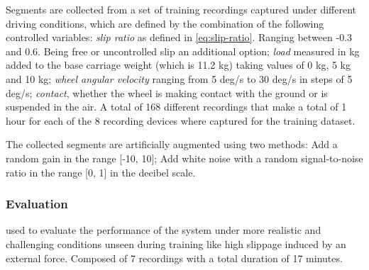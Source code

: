 Segments are collected from a set of training recordings captured under
different driving conditions, which are defined by the combination of the
following controlled variables: \emph{slip ratio} as defined in
\cref{eq:slip-ratio}. Ranging between -0.3 and 0.6. Being free or uncontrolled
slip an additional option; \emph{load} measured in kg added to the base
carriage weight (which is 11.2 kg) taking values of 0 kg, 5 kg and 10 kg;
\emph{wheel angular velocity} ranging from 5 deg/s to 30 deg/s in steps of 5
deg/s; \emph{contact}, whether the wheel is making contact with the ground or
is suspended in the air. A total of 168 different recordings that make a total
of 1 hour for each of the 8 recording devices where captured for the training
dataset.



The collected segments are artificially augmented using two methods: Add a
random gain in the range [-10, 10]; Add white noise with a random
signal-to-noise ratio in the range [0, 1] in the decibel scale.

\subsubsection{Evaluation} \label{subsubsec:evaluatio-dataset}
used to evaluate the performance of the system under more realistic and
challenging conditions unseen during training like high slippage induced by an
external force. Composed of 7 recordings with a total duration of 17 minutes.


